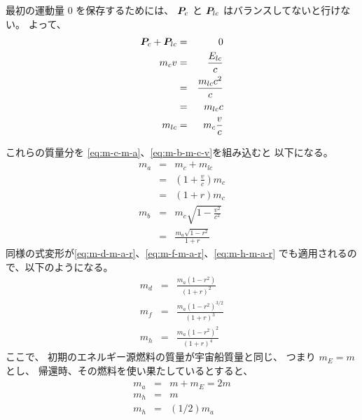 最初の運動量 0 を保存するためには、
${\bm{P}}_c$ と ${\bm{P}}_{lc}$ はバランスしてないと行けない。
よって、
  \begin{eqnarray}
    {\bm{P}}_c + {\bm{P}}_{lc}
      & = &
        0
  \\
    m_c v
      & = &
        \frac{E_{lc}}{c}
  \\
      & = &
        \frac{m_{lc} c^2}{c}
  \\
      & = &
        m_{lc} c
  \\
    m_{lc} & = & m_c \frac{v}{c}
  \end{eqnarray}
  

これらの質量分を \eqref{eq:m-c-m-a}、\eqref{eq:m-b-m-c-v}を組み込むと
以下になる。
  \begin{eqnarray}
    m_a
      & = &
        m_c + m_{lc}
  \\
      & = &
        \left(1 + \frac{v}{c}\right) m_c
  \\
      & = &
        (1 + r) m_c
  \\
    m_b & = & m_c \sqrt{1 - \frac{v^2}{c^2}}
  \\
        & = & 
           \frac{m_a \sqrt{1 - r^2}}{1+r} 
  \end{eqnarray}
同様の式変形が\eqref{eq:m-d-m-a-r}、\eqref{eq:m-f-m-a-r}、\eqref{eq:m-h-m-a-r}
でも適用されるので、以下のようになる。
  \begin{eqnarray}
    m_d
      & = & 
        \frac{m_a (1 - r^2)}{(1+r)^2}
  \\
    m_f
      & = & 
        \frac{m_a (1 - r^2)^{3/2}}{(1+r)^3}
  \\
    m_h
      & = & 
        \frac{m_a (1 - r^2)^2}{(1+r)^4}
  \label{eq:P:m-h-m-a-r}
  \end{eqnarray}
ここで、
初期のエネルギー源燃料の質量が宇宙船質量と同じ、
つまり $m_E=m$ とし、
帰還時、その燃料を使い果たしているとすると、
  \begin{eqnarray}
    m_a
      & = & 
        m + m_E = 2m
  \\
    m_h
      & = & 
        m
  \\
    m_h
      & = &
        (1/2) m_a
  \end{eqnarray}
